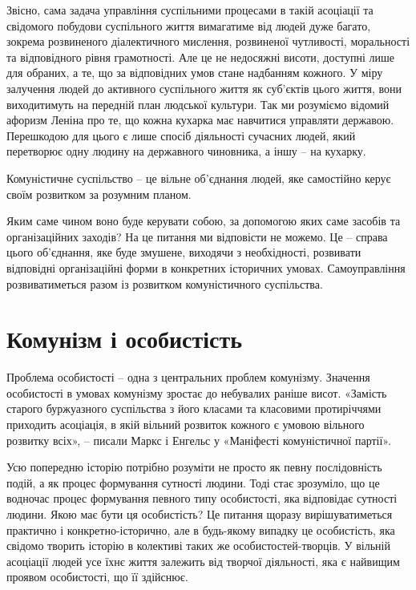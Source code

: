 \documentclass[12pt,a4paper,openany]{book}
\begin{document}
Звісно, сама задача управління суспільними процесами в такій асоціації та свідомого побудови суспільного життя вимагатиме від людей дуже багато, зокрема розвиненого діалектичного мислення, розвиненої чутливості, моральності та відповідного рівня грамотності. Але це не недосяжні висоти, доступні лише для обраних, а те, що за відповідних умов стане надбанням кожного. У міру залучення людей до активного суспільного життя як суб’єктів цього життя, вони виходитимуть на передній план людської культури. Так ми розуміємо відомий афоризм Леніна про те, що кожна кухарка має навчитися управляти державою. Перешкодою для цього є лише спосіб діяльності сучасних людей, який перетворює одну людину на державного чиновника, а іншу – на кухарку.

Комуністичне суспільство – це вільне об’єднання людей, яке самостійно керує своїм розвитком за розумним планом.

Яким саме чином воно буде керувати собою, за допомогою яких саме засобів та організаційних заходів? На це питання ми відповісти не можемо. Це – справа цього об’єднання, яке буде змушене, виходячи з необхідності, розвивати відповідні організаційні форми в конкретних історичних умовах. Самоуправління розвиватиметься разом із розвитком комуністичного суспільства.
\ifSubfilesClassLoaded{\setcounter{page}{47}}{}
\section{Комунізм і особистість}
\label{sec:08_kommunizm_lichnost}

Проблема особистості – одна з центральних проблем комунізму. Значення особистості в умовах комунізму зростає до небувалих раніше висот. «Замість старого буржуазного суспільства з його класами та класовими протиріччями приходить асоціація, в якій вільний розвиток кожного є умовою вільного розвитку всіх», – писали Маркс і Енгельс у «Маніфесті комуністичної партії».

Усю попередню історію потрібно розуміти не просто як певну послідовність подій, а як процес формування сутності людини. Тоді стає зрозуміло, що це водночас процес формування певного типу особистості, яка відповідає сутності людини. Якою має бути ця особистість? Це питання щоразу вирішуватиметься практично і конкретно-історично, але в будь-якому випадку це особистість, яка свідомо творить історію в колективі таких же особистостей-творців. У вільній асоціації людей усе їхнє життя залежить від творчої діяльності, яка є найвищим проявом особистості, що її здійснює.
\end{document}
